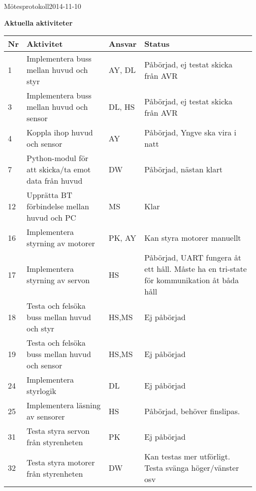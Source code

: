 \documentclass[titlepage, a4paper]{article}
\begin{document}
\begin{projektmote}{Mötesprotokoll}{2014-11-10}
\end{projektmote}

\newpage
\textbf{\Large Aktuella aktiviteter}
\begin{center}
\begin{tabularx}{\textwidth}{| p{4mm} | X | p{13.5mm} | X |}
	\hline
	\textbf{Nr} & \textbf{Aktivitet} & \textbf{Ansvar} & \textbf{Status} \\\hline	
	{1} & {Implementera buss mellan huvud och styr} & {AY, DL} & {Påbörjad, ej testat skicka från AVR} \\\hline
	{3} & {Implementera buss mellan huvud och sensor} & {DL, HS} & {Påbörjad, ej testat skicka från AVR} \\\hline
	{4} & {Koppla ihop huvud och sensor} & {AY} & {Påbörjad, Yngve ska vira i natt} \\\hline
	{7} & {Python-modul för att skicka/ta emot data från huvud} & {DW} & {Påbörjad, nästan klart} \\\hline
	{12} & {Upprätta BT förbindelse mellan huvud och PC} & {MS} & {Klar} \\\hline
	{16} & {Implementera styrning av motorer} & {PK, AY} & {Kan styra motorer manuellt} \\\hline
	{17} & {Implementera styrning av servon} & {HS} & {Påbörjad, UART fungera åt ett håll. Måste ha en tri-state för kommunikation åt båda håll} \\\hline
	{18} & {Testa och felsöka buss mellan huvud och styr} & {HS,MS} & {Ej påbörjad} \\\hline
	{19} & {Testa och felsöka buss mellan huvud och sensor} & {HS,MS} & {Ej påbörjad} \\\hline
	{24} & {Implementera styrlogik} & {DL} & {Ej påbörjad} \\\hline
	{25} & {Implementera läsning av sensorer} & {HS} & {Påbörjad, behöver finslipas.} \\\hline
	{31} & {Testa styra servon från styrenheten} & {PK} & {Ej påbörjad} \\\hline
	{32} & {Testa styra motorer från styrenheten} & {DW} & {Kan testas mer utförligt. Testa svänga höger/vänster osv} \\\hline
\end{tabularx}
\end{center}
\end{document}
